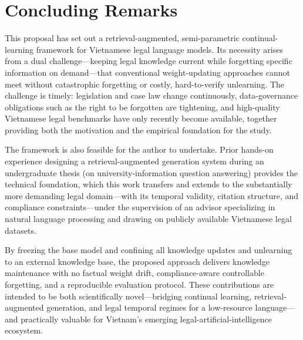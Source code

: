 \section{Concluding Remarks}

This proposal has set out a retrieval-augmented, semi-parametric continual-learning framework for Vietnamese legal language models. Its necessity arises from a dual challenge---keeping legal knowledge current while forgetting specific information on demand---that conventional weight-updating approaches cannot meet without catastrophic forgetting or costly, hard-to-verify unlearning. The challenge is timely: legislation and case law change continuously, data-governance obligations such as the right to be forgotten are tightening, and high-quality Vietnamese legal benchmarks have only recently become available, together providing both the motivation and the empirical foundation for the study.

The framework is also feasible for the author to undertake. Prior hands-on experience designing a retrieval-augmented generation system during an undergraduate thesis (on university-information question answering) provides the technical foundation, which this work transfers and extends to the substantially more demanding legal domain---with its temporal validity, citation structure, and compliance constraints---under the supervision of an advisor specializing in natural language processing and drawing on publicly available Vietnamese legal datasets.

By freezing the base model and confining all knowledge updates and unlearning to an external knowledge base, the proposed approach delivers knowledge maintenance with no factual weight drift, compliance-aware controllable forgetting, and a reproducible evaluation protocol. These contributions are intended to be both scientifically novel---bridging continual learning, retrieval-augmented generation, and legal temporal regimes for a low-resource language---and practically valuable for Vietnam's emerging legal-artificial-intelligence ecosystem.
